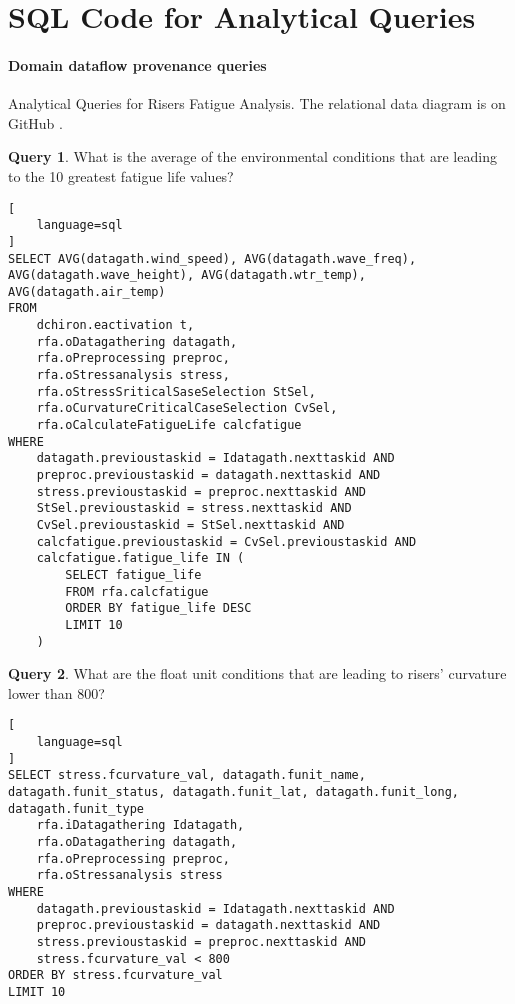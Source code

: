 \chapter{SQL Code for Analytical Queries}
\label{sql-codes}

\subsubsection{Domain dataflow provenance queries}
Analytical Queries for Risers Fatigue Analysis. The relational data diagram is on GitHub \cite{d-ChironGitHub}.

\noindent \textbf{Query 1}. What is the average of the environmental conditions that are leading to the 10 greatest fatigue life values?

\noindent\begin{minipage}[t]{1.0\linewidth}
\begin{lstlisting}[
    language=sql
]
SELECT AVG(datagath.wind_speed), AVG(datagath.wave_freq), AVG(datagath.wave_height), AVG(datagath.wtr_temp), AVG(datagath.air_temp)
FROM
	dchiron.eactivation t,
	rfa.oDatagathering datagath,
	rfa.oPreprocessing preproc,
	rfa.oStressanalysis stress,
	rfa.oStressSriticalSaseSelection StSel,
	rfa.oCurvatureCriticalCaseSelection CvSel,
	rfa.oCalculateFatigueLife calcfatigue
WHERE
	datagath.previoustaskid = Idatagath.nexttaskid AND
	preproc.previoustaskid = datagath.nexttaskid AND
	stress.previoustaskid = preproc.nexttaskid AND
	StSel.previoustaskid = stress.nexttaskid AND
	CvSel.previoustaskid = StSel.nexttaskid AND
	calcfatigue.previoustaskid = CvSel.previoustaskid AND
	calcfatigue.fatigue_life IN (
		SELECT fatigue_life
		FROM rfa.calcfatigue 
		ORDER BY fatigue_life DESC
		LIMIT 10
	)

\end{lstlisting}
\end{minipage}

\vspace{1.5em}
\noindent \textbf{Query 2}.
What are the float unit conditions that are leading to risers’ curvature lower than 800?

\noindent\begin{minipage}[t]{1.0\linewidth}
\begin{lstlisting}[
    language=sql
]
SELECT stress.fcurvature_val, datagath.funit_name, datagath.funit_status, datagath.funit_lat, datagath.funit_long, datagath.funit_type
	rfa.iDatagathering Idatagath,
	rfa.oDatagathering datagath,
	rfa.oPreprocessing preproc,
	rfa.oStressanalysis stress
WHERE
	datagath.previoustaskid = Idatagath.nexttaskid AND
	preproc.previoustaskid = datagath.nexttaskid AND
	stress.previoustaskid = preproc.nexttaskid AND
	stress.fcurvature_val < 800
ORDER BY stress.fcurvature_val 
LIMIT 10
\end{lstlisting}
\end{minipage}


